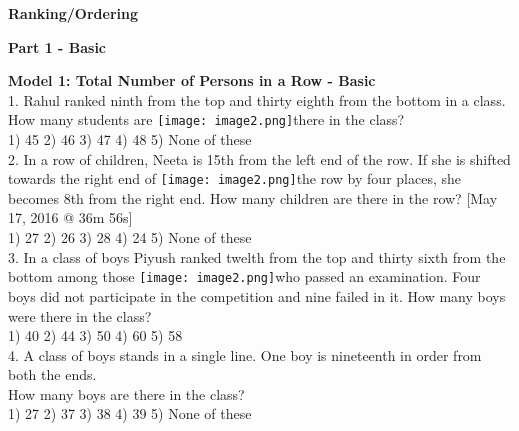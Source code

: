 \documentclass[
]{article}
\author{}
\date{}
\begin{document}
	
 

\begin{center}
	{\Large \textbf{Ranking/Ordering \\}}
\end{center}

{\large \textbf{Part 1 - Basic  \\}}

\textbf{Model 1: Total Number of Persons in a Row - Basic}\\
1. Rahul ranked ninth from the top and thirty eighth from the bottom in a class. How many students are \texttt{[image: image2.png]}there in the class?\\
1) 45 \hspace{2mm} 2) 46 \hspace{2mm}3) 47 \hspace{2mm}4) 48 \hspace{2mm}5) None of these\\

2. In a row of children, Neeta is 15th from the left end of the row. If she is shifted towards the right end of \texttt{[image: image2.png]}the row by four places, she becomes 8th from the right end. How many children are there in the row? [May 17, 2016 @ 36m 56s]\\
1) 27 \hspace{2mm}2) 26 \hspace{2mm}3) 28 \hspace{2mm}4) 24 \hspace{2mm}5) None of these\\

3. In a class of boys Piyush ranked twelth from the top and thirty sixth from the bottom among those  \texttt{[image: image2.png]}who passed an examination. Four boys did not participate in the competition and nine failed in it. How many boys were there in the class?\\
1) 40 \hspace{2mm}2) 44 \hspace{2mm}3) 50 \hspace{2mm}4) 60 \hspace{2mm}5) 58\\

4. A class of boys stands in a single line. One boy is nineteenth in order from both the ends.\\
How many boys are there in the class?\\
1) 27 \hspace{2mm}2) 37 \hspace{2mm}3) 38 \hspace{2mm}4) 39 \hspace{2mm}5) None of these\\
\end{document}
